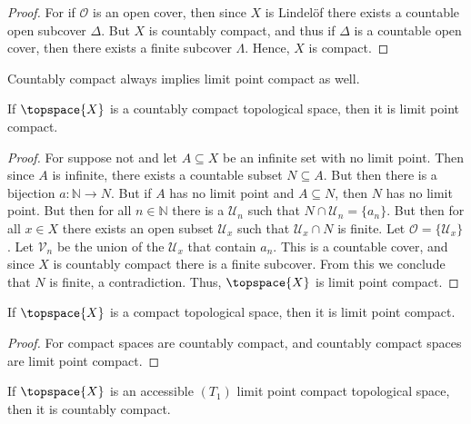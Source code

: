 \documentclass{article}                                                        %
\begin{document}
        \begin{proof}
            For if $\mathcal{O}$ is an open cover, then since $X$ is
            Lindel\"{o}f there exists a countable open subcover $\Delta$. But
            $X$ is countably compact, and thus if $\Delta$ is a countable open
            cover, then there exists a finite subcover $\Lambda$. Hence, $X$
            is compact.
        \end{proof}
        Countably compact always implies limit point compact as well.
        \begin{theorem}
            If $\topspace{X}$ is a countably compact topological space, then it
            is limit point compact.
        \end{theorem}
        \begin{proof}
            For suppose not and let $A\subseteq{X}$ be an infinite set with no
            limit point. Then since $A$ is infinite, there exists a countable
            subset $N\subseteq{A}$. But then there is a bijection
            $a:\mathbb{N}\rightarrow{N}$. But if $A$ has no limit point and
            $A\subseteq{N}$, then $N$ has no limit point. But then for all
            $n\in\mathbb{N}$ there is a $\mathcal{U}_{n}$ such that
            $N\cap\mathcal{U}_{n}=\{a_{n}\}$. But then for all $x\in{X}$ there
            exists an open subset $\mathcal{U}_{x}$ such that
            $\mathcal{U}_{x}\cap{N}$ is finite. Let
            $\mathcal{O}=\{\mathcal{U}_{x}\}$. Let $\mathcal{V}_{n}$ be the
            union of the $\mathcal{U}_{x}$ that contain $a_{n}$. This is a
            countable cover, and since $X$ is countably compact there is a
            finite subcover. From this we conclude that $N$ is finite, a
            contradiction. Thus, $\topspace{X}$ is limit point compact.
        \end{proof}
        \begin{theorem}
            If $\topspace{X}$ is a compact topological space, then it is limit
            point compact.
        \end{theorem}
        \begin{proof}
            For compact spaces are countably compact, and countably compact
            spaces are limit point compact.
        \end{proof}
        \begin{theorem}
            If $\topspace{X}$ is an accessible $(T_{1})$ limit point compact
            topological space, then it is countably compact.
        \end{theorem}
\end{document}
